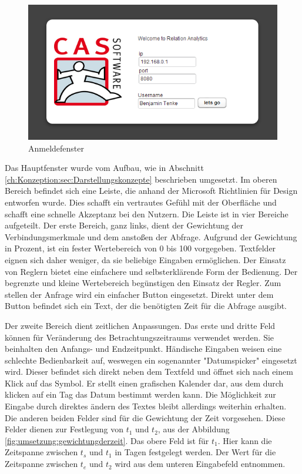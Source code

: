 \begin{figure}[htbp]
\centering
\includegraphics[scale=2.0]{pics/login.png}
\caption{Anmeldefenster}
\label{ergebniss_oberflaeche_anmeld}
\end{figure}

Das Hauptfenster wurde vom Aufbau, wie in Abschnitt \ref{ch:Konzeption:sec:Darstellungskonzepte} beschrieben umgesetzt. Im oberen Bereich befindet sich eine Leiste, die anhand der Microsoft Richtlinien für Design entworfen wurde. Dies schafft ein vertrautes Gefühl mit der Oberfläche und schafft eine schnelle Akzeptanz bei den Nutzern. Die Leiste ist in vier Bereiche aufgeteilt. Der erste Bereich, ganz links, dient der Gewichtung der Verbindungsmerkmale und dem anstoßen der Abfrage. Aufgrund der Gewichtung in Prozent, ist ein fester Wertebereich von 0 bis 100 vorgegeben. Textfelder eignen sich daher weniger, da sie beliebige Eingaben ermöglichen. Der Einsatz von Reglern bietet eine einfachere und selbsterklärende Form der Bedienung. Der begrenzte und kleine Wertebereich begünstigen den Einsatz der Regler. Zum stellen der Anfrage wird ein einfacher Button eingesetzt. Direkt unter dem Button befindet sich ein Text, der die benötigten Zeit für die Abfrage ausgibt. 

Der zweite Bereich dient zeitlichen Anpassungen. Das erste und dritte Feld können für Veränderung des Betrachtungszeitraums verwendet werden. Sie beinhalten den Anfangs- und Endzeitpunkt. Händische Eingaben weisen eine schlechte Bedienbarkeit auf, weswegen ein sogenannter "Datumspicker" eingesetzt wird. Dieser befindet sich direkt neben dem Textfeld und öffnet sich nach einem Klick auf das Symbol. Er stellt einen grafischen Kalender dar, aus dem durch klicken auf ein Tag das Datum bestimmt werden kann. Die Möglichkeit zur Eingabe durch direktes ändern des Textes bleibt allerdings weiterhin erhalten. Die anderen beiden Felder sind für die Gewichtung der Zeit vorgesehen. Diese Felder dienen zur Festlegung von $t_1$ und $t_2$, aus der Abbildung \ref{fig:umsetzung:gewichtungderzeit}. Das obere Feld ist für $t_1$. Hier kann die Zeitspanne zwischen $t_{s}$ und $t_1$ in Tagen festgelegt werden. Der Wert für die Zeitspanne zwischen $t_{e}$ und $t_2$ wird aus dem unteren Eingabefeld entnommen.

